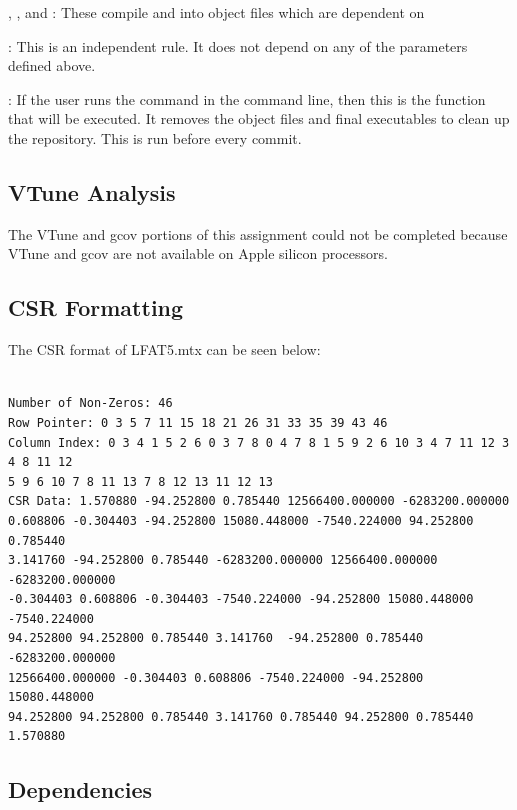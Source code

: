 \documentclass[12pt]{article}
\begin{document}
, , and : These compile  and  into object files which are dependent on 

: This is an independent rule. It does not depend on any of the parameters defined above.

: If the user runs the command  in the command line, then this is the function that will be executed. It removes the object files and final executables to clean up the repository. This is run before every commit.

\subsection{VTune Analysis}

The VTune and gcov portions of this assignment could not be completed because VTune and gcov are not available on Apple silicon processors.

\subsection{CSR Formatting}

The CSR format of LFAT5.mtx can be seen below:

 	\begin{mdframed}[style=myboxstyleTerminal1]
		\begin{verbatim}

Number of Non-Zeros: 46
Row Pointer: 0 3 5 7 11 15 18 21 26 31 33 35 39 43 46 
Column Index: 0 3 4 1 5 2 6 0 3 7 8 0 4 7 8 1 5 9 2 6 10 3 4 7 11 12 3 4 8 11 12
5 9 6 10 7 8 11 13 7 8 12 13 11 12 13 
CSR Data: 1.570880 -94.252800 0.785440 12566400.000000 -6283200.000000 
0.608806 -0.304403 -94.252800 15080.448000 -7540.224000 94.252800 0.785440
3.141760 -94.252800 0.785440 -6283200.000000 12566400.000000 -6283200.000000 
-0.304403 0.608806 -0.304403 -7540.224000 -94.252800 15080.448000 -7540.224000
94.252800 94.252800 0.785440 3.141760  -94.252800 0.785440 -6283200.000000
12566400.000000 -0.304403 0.608806 -7540.224000 -94.252800 15080.448000 
94.252800 94.252800 0.785440 3.141760 0.785440 94.252800 0.785440 1.570880

		\end{verbatim}
	\end{mdframed}

\subsection{Dependencies}
\end{document}
